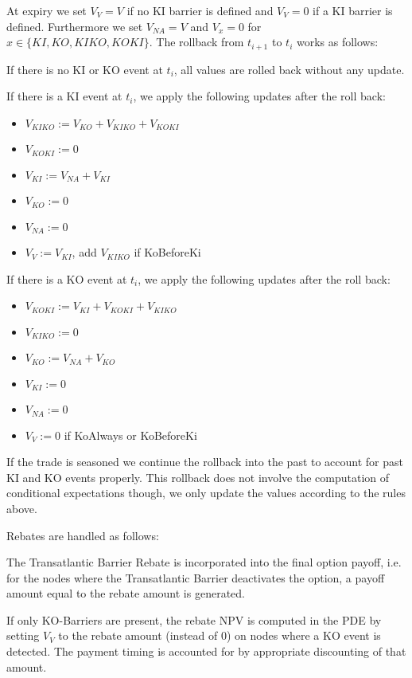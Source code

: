 At expiry we set $V_{V} = V$ if no KI barrier is defined and $V_{V} = 0$ if a KI barrier is defined. Furthermore we set
$V_{NA} = V$ and $V_x = 0$ for $x \in \{ KI, KO, KIKO, KOKI \}$. The rollback from $t_{i+1}$ to $t_i$ works as follows:

If there is no KI or KO event at $t_i$, all values are rolled back without any update.

If there is a KI event at $t_i$, we apply the following updates after the roll back:

\begin{itemize}
\item $V_{KIKO} := V_{KO} + V_{KIKO} + V_{KOKI}$
\item $V_{KOKI} := 0$
\item $V_{KI} := V_{NA} + V_{KI}$
\item $V_{KO} := 0$
\item $V_{NA} := 0$
\item $V_{V} := V_{KI}$, add $V_{KIKO}$ if KoBeforeKi
\end{itemize}

If there is a KO event at $t_i$, we apply the following updates after the roll back:

\begin{itemize}
\item $V_{KOKI} := V_{KI} + V_{KOKI} + V_{KIKO}$
\item $V_{KIKO} := 0$
\item $V_{KO} := V_{NA} + V_{KO}$
\item $V_{KI} := 0$
\item $V_{NA} := 0$
\item $V_{V} := 0$ if KoAlways or KoBeforeKi
\end{itemize}

If the trade is seasoned we continue the rollback into the past to account for past KI and KO events properly. This
rollback does not involve the computation of conditional expectations though, we only update the values according to the
rules above.

Rebates are handled as follows:

The Transatlantic Barrier Rebate is incorporated into the final option payoff, i.e. for
the nodes where the Transatlantic Barrier deactivates the option, a payoff amount equal to the rebate amount is
generated.

If only KO-Barriers are present, the rebate NPV is computed in the PDE by setting $V_{V}$ to the rebate amount (instead
of $0$) on nodes where a KO event is detected. The payment timing is accounted for by appropriate discounting of that
amount.

